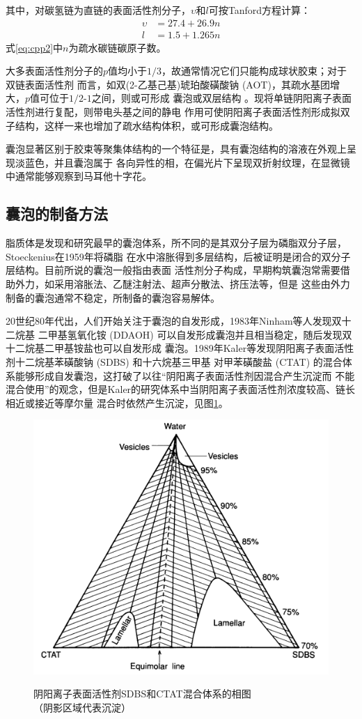 \documentclass[bachelor,winfonts,replaceperiod]{jnuthesis}
\begin{document}
    其中，对碳氢链为直链的表面活性剂分子，$\upsilon$和$l$可按Tanford方程计算：
    \begin{align}\label{eq:cpp2}
        \upsilon &= 27.4+26.9n\\
        l &= 1.5+1.265n
    \end{align}
    式\ref{eq:cpp2}中$n$为疏水碳链碳原子数。
    
    大多表面活性剂分子的$p$值均小于$1/3$，故通常情况它们只能构成球状胶束；对于双链表面活性剂
    而言，如双(2-乙基己基)琥珀酸磺酸钠 (AOT)，其疏水基团增大，$p$值可位于$1/2$-$1$之间，则或可形成
    囊泡或双层结构\cite{翟利民2007} 。现将单链阴阳离子表面活性剂进行复配，则带电头基之间的静电
    作用可使阴阳离子表面活性剂形成拟双子结构，这样一来也增加了疏水结构体积，或可形成囊泡结构。
    
    囊泡显著区别于胶束等聚集体结构的一个特征是，具有囊泡结构的溶液在外观上呈现淡蓝色，并且囊泡属于
    各向异性的相，在偏光片下呈现双折射纹理，在显微镜中通常能够观察到马耳他十字花\cite{刘洪国2016}。
        
    \subsection{囊泡的制备方法}
    脂质体是发现和研究最早的囊泡体系，所不同的是其双分子层为磷脂双分子层，Stoeckenius在1959年将磷脂
    在水中溶胀得到多层结构\cite{刘洪国2016}，后被证明是闭合的双分子层结构。目前所说的囊泡一般指由表面
    活性剂分子构成，早期构筑囊泡常需要借助外力，如采用溶胀法、乙醚注射法、超声分散法、挤压法等，但是
    这些由外力制备的囊泡通常不稳定，所制备的囊泡容易解体\cite{刘洪国2016}。
    
    20世纪80年代出，人们开始关注于囊泡的自发形成，1983年Ninham等人\cite{ninham1983}发现双十二烷基
    二甲基氢氧化铵 (DDAOH) 可以自发形成囊泡并且相当稳定，随后发现双十二烷基二甲基铵盐也可以自发形成
    囊泡。1989年Kaler等\cite{kaler1989}发现阴阳离子表面活性剂十二烷基苯磺酸钠 (SDBS) 和十六烷基三甲基
    对甲苯磺酸盐 (CTAT) 的混合体系能够形成自发囊泡，这打破了以往“阴阳离子表面活性剂因混合产生沉淀而
    不能混合使用”的观念，但是Kaler的研究体系中当阴阳离子表面活性剂浓度较高、链长相近或接近等摩尔量
    混合时依然产生沉淀，见图\ref{fig:vesicle-phase}。    
    \begin{figure}[htbp]
        \centering
        \includegraphics[width= .475\textwidth]{figure/vesicle-phase.png}\\
        \caption{阴阳离子表面活性剂SDBS和CTAT混合体系的相图\cite{kaler1989}\\{\footnotesize{（阴影区域代表沉淀）}}}
        \label{fig:vesicle-phase}
    \end{figure}
\end{document}
